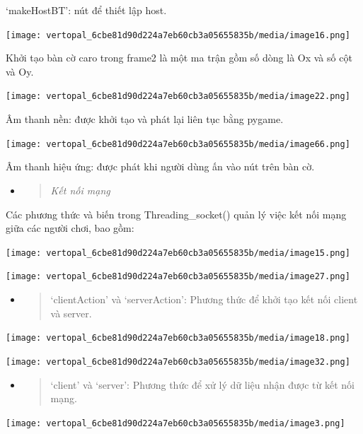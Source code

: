 \documentclass[a4paper]{article}
\begin{document}
`makeHostBT': nút để thiết lập host.

\texttt{[image: vertopal\_6cbe81d90d224a7eb60cb3a05655835b/media/image16.png]}

Khởi tạo bàn cờ caro trong frame2 là một ma trận gồm số dòng là Ox và số
cột và Oy.

\texttt{[image: vertopal\_6cbe81d90d224a7eb60cb3a05655835b/media/image22.png]}

Âm thanh nền: được khởi tạo và phát lại liên tục bằng pygame.

\texttt{[image: vertopal\_6cbe81d90d224a7eb60cb3a05655835b/media/image66.png]}

Âm thanh hiệu ứng: được phát khi người dùng ấn vào nút trên bàn cờ.

\begin{itemize}
\item
  \begin{quote}
  \emph{Kết nối mạng}
  \end{quote}
\end{itemize}

Các phương thức và biến trong Threading\_socket() quản lý việc kết nối
mạng giữa các người chơi, bao gồm:

\texttt{[image: vertopal\_6cbe81d90d224a7eb60cb3a05655835b/media/image15.png]}

\texttt{[image: vertopal\_6cbe81d90d224a7eb60cb3a05655835b/media/image27.png]}

\begin{itemize}
\item
  \begin{quote}
  `clientAction' và `serverAction': Phương thức để khởi tạo kết nối
  client và server.
  \end{quote}
\end{itemize}

\texttt{[image: vertopal\_6cbe81d90d224a7eb60cb3a05655835b/media/image18.png]}

\texttt{[image: vertopal\_6cbe81d90d224a7eb60cb3a05655835b/media/image32.png]}

\begin{itemize}
\item
  \begin{quote}
  `client' và `server': Phương thức để xử lý dữ liệu nhận được từ kết
  nối mạng.
  \end{quote}
\end{itemize}

\texttt{[image: vertopal\_6cbe81d90d224a7eb60cb3a05655835b/media/image3.png]}
\end{document}
